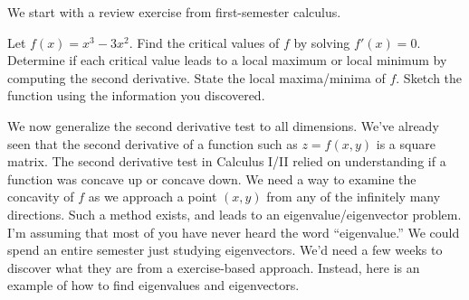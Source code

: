We start with a review exercise from first-semester calculus.
\begin{review*}
 Let $f(x) = x^3-3x^2$.  Find the critical values of $f$ by solving $f'(x)=0$.  Determine if each critical value leads to a local maximum or local minimum by computing the second derivative. State the local maxima/minima of $f$. Sketch the function using the information you discovered.  
\end{review*}


We now generalize the second derivative test to all dimensions. We've already seen that the second derivative of a function such as $z=f(x,y)$ is a square matrix. The second derivative test in Calculus I/II relied on understanding if a function was concave up or concave down. We need a way to examine the concavity of $f$ as we approach a point $(x,y)$ from any of the infinitely many directions. Such a method exists, and leads to an eigenvalue/eigenvector problem. I'm assuming that most of you have never heard the word ``eigenvalue.'' We could spend an entire semester just studying eigenvectors. We'd need a few weeks to discover what they are from a exercise-based approach.  Instead, here is an example of how to find eigenvalues and eigenvectors.

